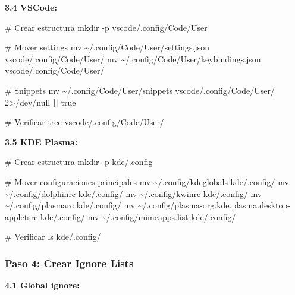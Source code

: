 \documentclass[
  doc,
  floatsintext,
  longtable,
  a4paper,
  nolmodern,
  notxfonts,
  notimes,
  12pt,
  colorlinks=true,linkcolor=blue,citecolor=blue,urlcolor=blue]{apa7}
\newenvironment{Shaded}{\begin{snugshade}}{\end{snugshade}}
\newcommand{\AttributeTok}[1]{\textcolor[rgb]{0.40,0.45,0.13}{#1}}
\newcommand{\CommentTok}[1]{\textcolor[rgb]{0.37,0.37,0.37}{#1}}
\newcommand{\DecValTok}[1]{\textcolor[rgb]{0.68,0.00,0.00}{#1}}
\newcommand{\ExtensionTok}[1]{\textcolor[rgb]{0.00,0.23,0.31}{#1}}
\newcommand{\FunctionTok}[1]{\textcolor[rgb]{0.28,0.35,0.67}{#1}}
\newcommand{\KeywordTok}[1]{\textcolor[rgb]{0.00,0.23,0.31}{\textbf{#1}}}
\newcommand{\NormalTok}[1]{\textcolor[rgb]{0.00,0.23,0.31}{#1}}
\newcommand{\OperatorTok}[1]{\textcolor[rgb]{0.37,0.37,0.37}{#1}}
\begin{document}
\textbf{3.4 VSCode:}

\begin{Shaded}
\begin{Highlighting}[]
\CommentTok{\# Crear estructura}
\FunctionTok{mkdir} \AttributeTok{{-}p}\NormalTok{ vscode/.config/Code/User}

\CommentTok{\# Mover settings}
\FunctionTok{mv}\NormalTok{ \textasciitilde{}/.config/Code/User/settings.json vscode/.config/Code/User/}
\FunctionTok{mv}\NormalTok{ \textasciitilde{}/.config/Code/User/keybindings.json vscode/.config/Code/User/}

\CommentTok{\# Snippets}
\FunctionTok{mv}\NormalTok{ \textasciitilde{}/.config/Code/User/snippets vscode/.config/Code/User/ }\DecValTok{2}\OperatorTok{\textgreater{}}\NormalTok{/dev/null }\KeywordTok{||} \FunctionTok{true}

\CommentTok{\# Verificar}
\ExtensionTok{tree}\NormalTok{ vscode/.config/Code/User/}
\end{Highlighting}
\end{Shaded}

\textbf{3.5 KDE Plasma:}

\begin{Shaded}
\begin{Highlighting}[]
\CommentTok{\# Crear estructura}
\FunctionTok{mkdir} \AttributeTok{{-}p}\NormalTok{ kde/.config}

\CommentTok{\# Mover configuraciones principales}
\FunctionTok{mv}\NormalTok{ \textasciitilde{}/.config/kdeglobals kde/.config/}
\FunctionTok{mv}\NormalTok{ \textasciitilde{}/.config/dolphinrc kde/.config/}
\FunctionTok{mv}\NormalTok{ \textasciitilde{}/.config/kwinrc kde/.config/}
\FunctionTok{mv}\NormalTok{ \textasciitilde{}/.config/plasmarc kde/.config/}
\FunctionTok{mv}\NormalTok{ \textasciitilde{}/.config/plasma{-}org.kde.plasma.desktop{-}appletsrc kde/.config/}
\FunctionTok{mv}\NormalTok{ \textasciitilde{}/.config/mimeapps.list kde/.config/}

\CommentTok{\# Verificar}
\FunctionTok{ls}\NormalTok{ kde/.config/}
\end{Highlighting}
\end{Shaded}

\subsubsection{Paso 4: Crear Ignore
Lists}\label{paso-4-crear-ignore-lists}

\textbf{4.1 Global ignore:}
\end{document}
